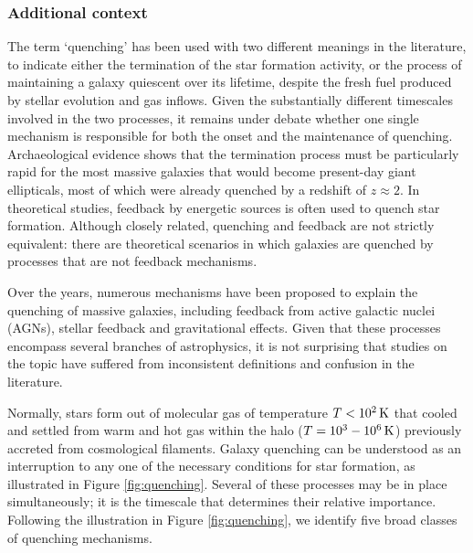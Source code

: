 \documentclass[a4paper,10pt]{article}
\begin{document}
\subsubsection{Additional context}

The term `quenching' has been used with two different meanings in the literature, to indicate either the termination of the star formation activity, or the process of maintaining a galaxy quiescent over its lifetime, despite the fresh fuel produced by stellar evolution and gas inflows. Given the substantially different timescales involved in the two processes, it remains under debate whether one single mechanism is responsible for both the onset and the maintenance of quenching. Archaeological evidence shows that the termination process must be particularly rapid for the most massive galaxies that would become present-day giant ellipticals, most of which were already quenched by a redshift of $z\approx2$. In theoretical studies, feedback by energetic sources is often used to quench star formation. Although closely related, quenching and feedback are not strictly equivalent: there are theoretical scenarios in which galaxies are quenched by processes that are not feedback mechanisms.

{\noindent}Over the years, numerous mechanisms have been proposed to explain the quenching of massive galaxies, including feedback from active galactic nuclei (AGNs), stellar feedback and gravitational effects. Given that these processes encompass several branches of astrophysics, it is not surprising that studies on the topic have suffered from inconsistent definitions and confusion in the literature.

{\noindent}Normally, stars form out of molecular gas of temperature $T<10^2\,{\rm K}$ that cooled and settled from warm and hot gas within the halo ($T=10^3-10^6\,{\rm K}$) previously accreted from cosmological filaments. Galaxy quenching can be understood as an interruption to any one of the necessary conditions for star formation, as illustrated in Figure \ref{fig:quenching}. Several of these processes may be in place simultaneously; it is the timescale that determines their relative importance. Following the illustration in Figure \ref{fig:quenching}, we identify five broad classes of quenching mechanisms.
\end{document}
